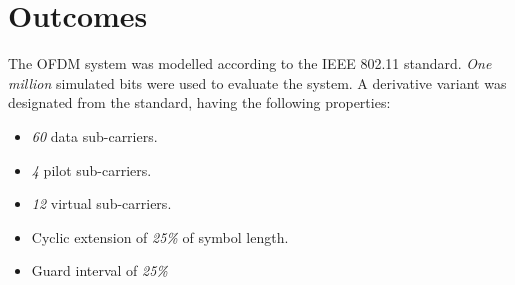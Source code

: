 \chapter{Outcomes}

The OFDM system was modelled according to the IEEE 802.11 standard. \emph{One million} simulated bits were used to evaluate the system. A derivative variant was designated from the standard, having the following properties:
\begin{itemize}
	\item \emph{60} data sub-carriers.
	\item \emph{4} pilot sub-carriers.
	\item \emph{12} virtual sub-carriers.
	\item Cyclic extension of \emph{25\%} of symbol length.
	\item Guard interval of \emph{25\%}
\end{itemize}






